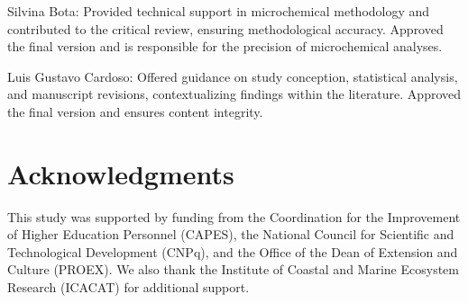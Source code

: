 \documentclass[utf8]{FrontiersinHarvard}
\begin{document}
Silvina Bota: Provided technical support in microchemical methodology
and contributed to the critical review, ensuring methodological
accuracy. Approved the final version and is responsible for the
precision of microchemical analyses.

Luis Gustavo Cardoso: Offered guidance on study conception, statistical
analysis, and manuscript revisions, contextualizing findings within the
literature. Approved the final version and ensures content integrity.

\section*{Acknowledgments}\label{acknowledgments}

This study was supported by funding from the Coordination for the
Improvement of Higher Education Personnel (CAPES), the National Council
for Scientific and Technological Development (CNPq), and the Office of
the Dean of Extension and Culture (PROEX). We also thank the Institute
of Coastal and Marine Ecosystem Research (ICACAT) for additional
support.



\end{document}
